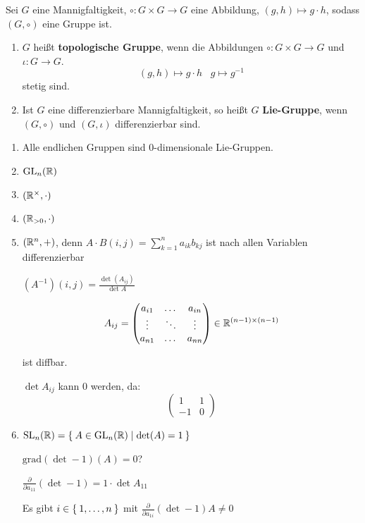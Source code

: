 \begin{definition}
    Sei $G$ eine Mannigfaltigkeit, $\circ: G \times G \rightarrow G$
    eine Abbildung, $(g,h) \mapsto g \cdot h$, sodass $(G, \circ)$
    eine Gruppe ist.

    \begin{enumerate}[label=(\alph*)]
        \item $G$ heißt \textbf{topologische Gruppe},
              wenn die Abbildungen $\circ: G \times G \rightarrow G$
              und $\iota: G \rightarrow G$.
              \[(g, h) \mapsto g \cdot h\;\;\; g \mapsto g^{-1}\]
              stetig sind.
        \item Ist $G$ eine differenzierbare Mannigfaltigkeit, so heißt
              $G$ \textbf{Lie-Gruppe}, wenn
              $(G, \circ)$ und $(G, \iota)$ differenzierbar sind.
    \end{enumerate}
\end{definition}

\begin{beispiel}
    \begin{enumerate}[label=\arabic*)]
        \item Alle endlichen Gruppen sind 0-dimensionale Lie-Gruppen.
        \item $\text{GL}_n(\mathbb{R})$
        \item $(\mathbb{R}^\times, \cdot)$
        \item $(\mathbb{R}_{>0}, \cdot)$
        \item $(\mathbb{R}^n, +)$, denn $A \cdot B (i,j) = \sum_{k=1}^n a_{ik} b_{kj}$ ist
              nach allen Variablen differenzierbar

              $(A^{-1}) (i,j) = \frac{\det(A_{ij})}{\det A}$

              \[A_{ij} = \begin{pmatrix}
                a_{i1} & \dots  & a_{in}\\
                \vdots & \ddots & \vdots\\
                a_{n1} & \dots  & a_{nn}
              \end{pmatrix} \in \mathbb{R}^{(n-1) \times (n-1)}\]

            ist diffbar.

            $\det A_{ij}$ kann $0$ werden, da:
            \[\begin{pmatrix}1 & 1\\-1&0\end{pmatrix}\]
        \item $\text{SL}_n(\mathbb{R}) = \Set{A \in \text{GL}_n(\ensuremath{\mathbb{R}}) | \text{det}(A) = 1} $ 

              $\text{grad}(\det-1)(A) = 0$?

              $\frac{\partial}{\partial a_{11}} (\det -1) = 1 \cdot \det A_{11}$

              Es gibt $i \in \Set{1, \dots, n}$ mit $\frac{\partial}{\partial a_{1i}} (\det -1) A \neq 0$
    \end{enumerate}
\end{beispiel}

